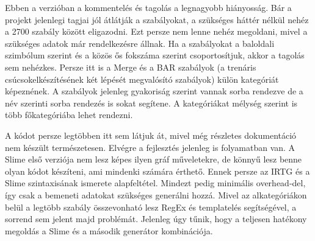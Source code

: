 Ebben a verzióban a kommentelés és tagolás a legnagyobb hiányosság. 
Bár a projekt jelenlegi tagjai jól átlátják a szabályokat, a szükséges háttér nélkül nehéz a 2700 szabály között eligazodni. 
Ezt persze nem lenne nehéz megoldani, mivel a szükséges adatok már rendelkezésre állnak. 
Ha a szabályokat a baloldali szimbólum szerint és a közös ős fokszáma szerint csoportosítjuk, akkor a tagolás sem nehézkes. 
Persze itt is a Merge és a BAR szabályok (a trenáris csúcsokelkészítésének két lépését megvalósító szabályok) külön kategóriát képeznének. 
A szabályok jelenleg gyakoriság szerint vannak sorba rendezve de a név szerinti sorba rendezés is sokat segítene. 
A kategóriákat mélység szerint is több főkategóriába lehet rendezni.

A kódot persze legtöbben itt sem látjuk át, mivel még részletes dokumentáció nem készült természetesen.
Elvégre a fejlesztés jelenleg is folyamatban van. 
A Slime első verziója nem lesz képes ilyen gráf műveletekre, de könnyű lesz benne olyan kódot készíteni, ami mindenki számára érthető.
Ennek persze az IRTG és a Slime szintaxisának ismerete alapfeltétel. 
Mindezt pedig minimális overhead-del, így csak a bemeneti adatokat szükséges generálni hozzá. 
Mivel az alkategóriákon belül a legtöbb szabály összevonható lesz RegEx és templatelés segítségével, a sorrend sem jelent majd problémát.
Jelenleg úgy tűnik, hogy a teljesen hatékony megoldás a Slime és a második generátor kombinációja.